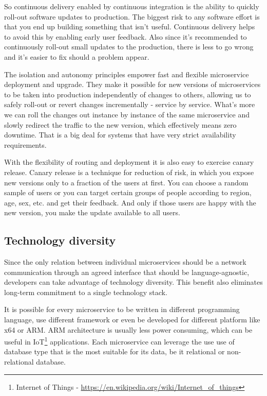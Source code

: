 \documentclass[12pt,oneside]{fithesis2}
\begin{document}
So continuous delivery enabled by continuous integration is the ability to quickly roll-out software updates to production. The biggest risk to any software effort is that you end up building something that isn't useful. Continuous delivery helps to avoid this by enabling early user feedback. Also since it's recommended to continuously roll-out small updates to the production, there is less to go wrong and it's easier to fix should a problem appear.

The isolation and autonomy principles empower fast and flexible microservice deployment and upgrade. They make it possible for new versions of microservices to be taken into production independently of changes to others, allowing us to safely roll-out or revert changes incrementally - service by service. What's more we can roll the changes out instance by instance of the same microservice and slowly redirect the traffic to the new version, which effectively means zero downtime. That is a big deal for systems that have very strict availability requirements.

With the flexibility of routing and deployment it is also easy to exercise canary release. Canary release is a technique for reduction of risk, in which you expose new versions only to a fraction of the users at first. You can choose a random sample of users or you can target certain groups of people according to region, age, sex, etc. and get their feedback. And only if those users are happy with the new version, you make the update available to all users.

\subsection{Technology diversity}

Since the only relation between individual microservices should be a network communication through an agreed interface that should be language-agnostic, developers can take advantage of technology diversity. This benefit also eliminates long-term commitment to a single technology stack.

It is possible for every microservice to be written in different programming language, use different framework or even be developed for different platform like x64 or ARM. ARM architecture is usually less power consuming, which can be useful in IoT\footnote{Internet of Things - \url{https://en.wikipedia.org/wiki/Internet_of_things}} applications. Each microservice can leverage the use use of database type that is the most suitable for its data, be it relational or non-relational database.
\end{document}
